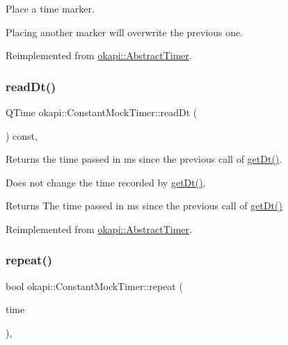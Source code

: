 Place a time marker. 

Placing another marker will overwrite the previous one. 

Reimplemented from \mbox{\hyperlink{classokapi_1_1AbstractTimer_a34c9be79510d23d702fd22188d542ec9}{okapi\+::\+Abstract\+Timer}}.

\mbox{\label{classokapi_1_1ConstantMockTimer_a5e0e09fe1e256e6076ace75d914d4ec6}} 
\subsubsection{\texorpdfstring{readDt()}{readDt()}}
{\footnotesize\ttfamily Q\+Time okapi\+::\+Constant\+Mock\+Timer\+::read\+Dt (\begin{DoxyParamCaption}{ }\end{DoxyParamCaption}) const\hspace{0.3cm}{\ttfamily [override]}, {\ttfamily [virtual]}}



Returns the time passed in ms since the previous call of \mbox{\hyperlink{classokapi_1_1ConstantMockTimer_a35956bfe4078dbf73d67828cb41f9e26}{get\+Dt()}}. 

Does not change the time recorded by \mbox{\hyperlink{classokapi_1_1ConstantMockTimer_a35956bfe4078dbf73d67828cb41f9e26}{get\+Dt()}}.

\begin{DoxyReturn}{Returns}
The time passed in ms since the previous call of \mbox{\hyperlink{classokapi_1_1ConstantMockTimer_a35956bfe4078dbf73d67828cb41f9e26}{get\+Dt()}} 
\end{DoxyReturn}


Reimplemented from \mbox{\hyperlink{classokapi_1_1AbstractTimer_a4208d7ef0b828422ba02dfd563306ab1}{okapi\+::\+Abstract\+Timer}}.

\mbox{\label{classokapi_1_1ConstantMockTimer_a8f9adcb23b15937ca6d4973b3ee610af}} 
\subsubsection{\texorpdfstring{repeat()}{repeat()}\hspace{0.1cm}{\footnotesize\ttfamily [1/2]}}
{\footnotesize\ttfamily bool okapi\+::\+Constant\+Mock\+Timer\+::repeat (\begin{DoxyParamCaption}\item[{Q\+Time}]{time }\end{DoxyParamCaption})\hspace{0.3cm}{\ttfamily [override]}, {\ttfamily [virtual]}}



